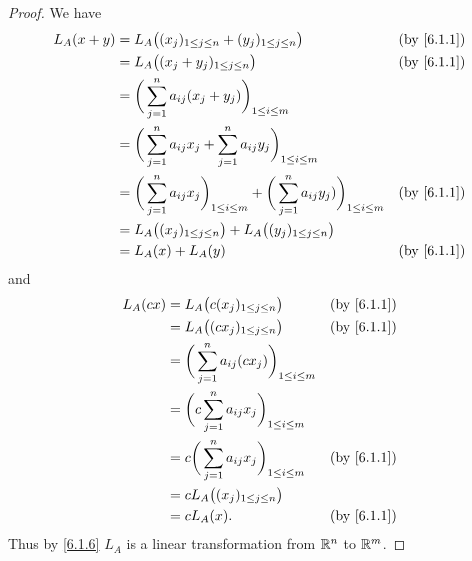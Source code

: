 \begin{proof}
  We have
  \begin{align*}
    L_A(x + y) & = L_A\big((x_j)_{1 \leq j \leq n} + (y_j)_{1 \leq j \leq n}\big)                                                     & \text{(by \cref{6.1.1})} \\
               & = L_A\big((x_j + y_j)_{1 \leq j \leq n}\big)                                                                         & \text{(by \cref{6.1.1})} \\
               & = \bigg(\sum_{j = 1}^n a_{ij} (x_j + y_j)\bigg)_{1 \leq i \leq m}                                                                               \\
               & = \bigg(\sum_{j = 1}^n a_{ij} x_j + \sum_{j = 1}^n a_{ij} y_j\bigg)_{1 \leq i \leq m}                                                           \\
               & = \bigg(\sum_{j = 1}^n a_{ij} x_j\bigg)_{1 \leq i \leq m} + \bigg(\sum_{j = 1}^n a_{ij} y_j)\bigg)_{1 \leq i \leq m} & \text{(by \cref{6.1.1})} \\
               & = L_A\big((x_j)_{1 \leq j \leq n}\big) + L_A\big((y_j)_{1 \leq j \leq n}\big)                                                                   \\
               & = L_A(x) + L_A(y)                                                                                                    & \text{(by \cref{6.1.1})}
  \end{align*}
  and
  \begin{align*}
    L_A(cx) & = L_A\big(c(x_j)_{1 \leq j \leq n}\big)                       & \text{(by \cref{6.1.1})} \\
            & = L_A\big((cx_j)_{1 \leq j \leq n}\big)                       & \text{(by \cref{6.1.1})} \\
            & = \bigg(\sum_{j = 1}^n a_{ij} (c x_j)\bigg)_{1 \leq i \leq m}                            \\
            & = \bigg(c \sum_{j = 1}^n a_{ij} x_j\bigg)_{1 \leq i \leq m}                              \\
            & = c \bigg(\sum_{j = 1}^n a_{ij} x_j\bigg)_{1 \leq i \leq m}   & \text{(by \cref{6.1.1})} \\
            & = c L_A\big((x_j)_{1 \leq j \leq n}\big)                                                 \\
            & = c L_A(x).                                                   & \text{(by \cref{6.1.1})}
  \end{align*}
  Thus by \cref{6.1.6} \(L_A\) is a linear transformation from \(\mathbb{R}^n\) to \(\mathbb{R}^m\).
\end{proof}

